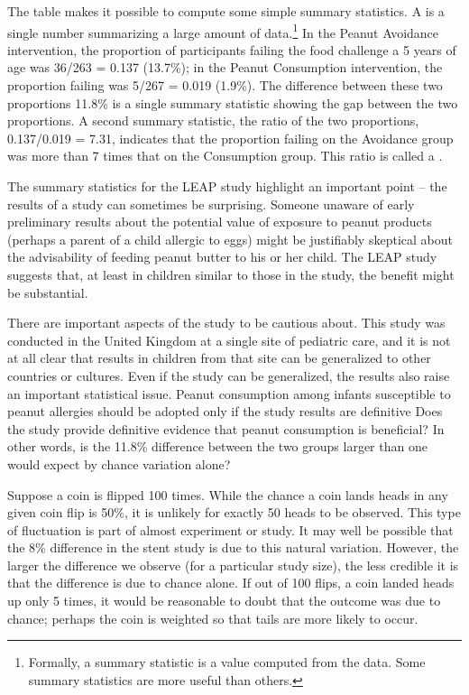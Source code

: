 \begin{doublespace}
The table makes it possible to compute some simple summary statistics. A  is a single number summarizing a large amount of data.\footnote{Formally, a summary statistic is a value computed from the data. Some summary statistics are more useful than others.} In the Peanut Avoidance intervention, the proportion of participants failing the food challenge a 5 years of age was 36/263 = 0.137 (13.7\%); in the Peanut Consumption intervention, the proportion failing was 5/267 = 0.019 (1.9\%). The difference between these two proportions 11.8\% is a single summary statistic showing the gap between the two proportions.  A second summary statistic, the ratio of the two proportions, 0.137/0.019 = 7.31, indicates that the proportion failing on the Avoidance group was more than 7 times that on the Consumption group.   This ratio is called a .

The summary statistics for the LEAP study highlight an important point -- the results of a study can sometimes be surprising.  Someone unaware of early preliminary results about the potential value of exposure to peanut products (perhaps a parent of a child allergic to eggs) might be justifiably skeptical about the advisability of feeding peanut butter to his or her child.  The LEAP study suggests that, at least in children similar to those in the study, the benefit might be substantial. 

There are important aspects of the study to be cautious about.  This study was conducted in the United Kingdom at a single site of pediatric care, and it is not at all clear that results in children from that site can be generalized to other countries or cultures.  Even if the study can be generalized, the results also raise an important statistical issue.  Peanut consumption among infants susceptible to peanut allergies should be adopted only if the study results are definitive  Does the study provide definitive evidence that peanut consumption is beneficial? In other words, is the 11.8\% difference between the two groups larger than one would expect by chance variation alone? 

Suppose a coin is flipped 100 times. While the chance a coin lands heads in any given coin flip is 50\%, it is unlikely for exactly 50 heads to be observed. This type of fluctuation is part of almost experiment or study. It may well be possible that the 8\% difference in the stent study is due to this natural variation. However, the larger the difference we observe (for a particular study size), the less credible it is that the difference is due to chance alone. If out of 100 flips, a coin landed heads up only 5 times, it would be reasonable to doubt that the outcome was due to chance; perhaps the coin is weighted so that tails are more likely to occur.


\end{doublespace}
